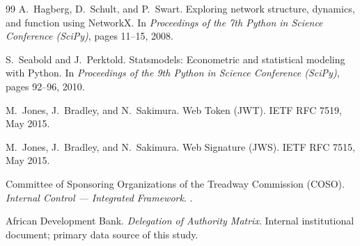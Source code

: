 \begin{thebibliography}{99}
A.~Hagberg, D.~Schult, and P.~Swart.
\newblock Exploring network structure, dynamics, and function using {NetworkX}.
\newblock In \emph{Proceedings of the 7th Python in Science Conference (SciPy)},
  pages 11--15, 2008.

S.~Seabold and J.~Perktold.
\newblock Statsmodels: Econometric and statistical modeling with {P}ython.
\newblock In \emph{Proceedings of the 9th Python in Science Conference (SciPy)},
  pages 92--96, 2010.

M.~Jones, J.~Bradley, and N.~Sakimura.
 Web Token ({JWT}).
\newblock IETF RFC 7519, May 2015.

M.~Jones, J.~Bradley, and N.~Sakimura.
 Web Signature ({JWS}).
\newblock IETF RFC 7515, May 2015.

Committee of Sponsoring Organizations of the Treadway Commission (COSO).
\newblock \emph{Internal Control --- Integrated Framework}.
.

African Development Bank.
\newblock \emph{Delegation of Authority Matrix}.
\newblock Internal institutional document; primary data source of this study.

\end{thebibliography}


\renewcommand{\bibname}{Webography}

